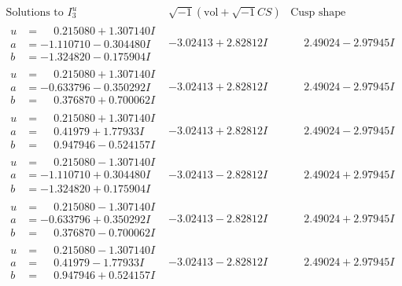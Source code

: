 \documentclass[1p]{elsarticle_modified}
\theoremstyle{definition}
\newcommand{\I}{\sqrt{-1}}
\begin{document}
$$\begin{array}{c|c|c}  
\text{Solutions to }I^u_{3}& \I (\text{vol} + \sqrt{-1}CS) & \text{Cusp shape}\\
 \hline 
\begin{aligned}
u &= \phantom{-}0.215080 + 1.307140 I \\
a &= -1.110710 - 0.304480 I \\
b &= -1.324820 - 0.175904 I\end{aligned}
 & -3.02413 + 2.82812 I & \phantom{-}2.49024 - 2.97945 I \\ \hline\begin{aligned}
u &= \phantom{-}0.215080 + 1.307140 I \\
a &= -0.633796 - 0.350292 I \\
b &= \phantom{-}0.376870 + 0.700062 I\end{aligned}
 & -3.02413 + 2.82812 I & \phantom{-}2.49024 - 2.97945 I \\ \hline\begin{aligned}
u &= \phantom{-}0.215080 + 1.307140 I \\
a &= \phantom{-}0.41979 + 1.77933 I \\
b &= \phantom{-}0.947946 - 0.524157 I\end{aligned}
 & -3.02413 + 2.82812 I & \phantom{-}2.49024 - 2.97945 I \\ \hline\begin{aligned}
u &= \phantom{-}0.215080 - 1.307140 I \\
a &= -1.110710 + 0.304480 I \\
b &= -1.324820 + 0.175904 I\end{aligned}
 & -3.02413 - 2.82812 I & \phantom{-}2.49024 + 2.97945 I \\ \hline\begin{aligned}
u &= \phantom{-}0.215080 - 1.307140 I \\
a &= -0.633796 + 0.350292 I \\
b &= \phantom{-}0.376870 - 0.700062 I\end{aligned}
 & -3.02413 - 2.82812 I & \phantom{-}2.49024 + 2.97945 I \\ \hline\begin{aligned}
u &= \phantom{-}0.215080 - 1.307140 I \\
a &= \phantom{-}0.41979 - 1.77933 I \\
b &= \phantom{-}0.947946 + 0.524157 I\end{aligned}
 & -3.02413 - 2.82812 I & \phantom{-}2.49024 + 2.97945 I \\ \hline\begin{aligned}

\end{aligned}
\end{array}$$
\end{document}
